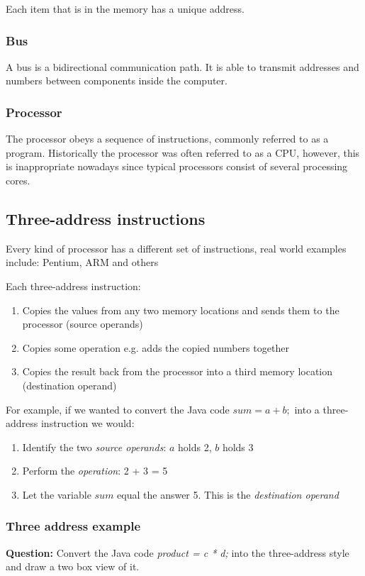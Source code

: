 \documentclass{article} %
\begin{document}
Each item that is in the memory has a unique address.

\subsubsection{Bus}
A bus is a bidirectional communication path. It is able to transmit addresses and numbers between components inside the computer.

\subsubsection{Processor}
The processor obeys a sequence of instructions, commonly referred to as a program.
Historically the processor was often referred to as a CPU, however, this is inappropriate nowadays since typical processors consist of several processing cores.

\subsection{Three-address instructions}
Every kind of processor has a different set of instructions, real world examples include: Pentium, ARM and others

Each three-address instruction:
\begin{enumerate}
	\item Copies the values from any two memory locations and sends them to the processor (source operands)
	\item Copies some operation e.g. adds the copied numbers together
	\item Copies the result back from the processor into a third memory location (destination operand)
\end{enumerate}

For example, if we wanted to convert the Java code $sum = a + b;$ into a three-address instruction we would:
\begin{enumerate}
	\item Identify the two {\it source operands}: $a$ holds 2, $b$ holds 3
	\item Perform the {\it operation}: 2 + 3 = 5
	\item Let the variable $sum$ equal the answer 5. This is the {\it destination operand}
\end{enumerate}

\subsubsection{Three address example}
{\bf Question:} Convert the Java code {\it product = c * d;} into the three-address style and draw a two box view of it.
\end{document}
